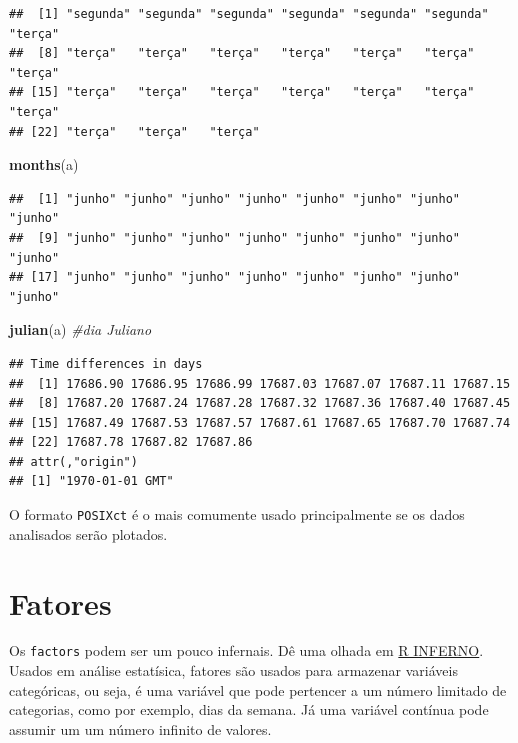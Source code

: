 \documentclass[]{book}
\newenvironment{Shaded}{\begin{snugshade}}{\end{snugshade}}
\newcommand{\KeywordTok}[1]{\textcolor[rgb]{0.13,0.29,0.53}{\textbf{#1}}}
\newcommand{\CommentTok}[1]{\textcolor[rgb]{0.56,0.35,0.01}{\textit{#1}}}
\newcommand{\NormalTok}[1]{#1}
\theoremstyle{definition}
\theoremstyle{definition}
\theoremstyle{definition}
\theoremstyle{remark}
\begin{document}
\begin{verbatim}
##  [1] "segunda" "segunda" "segunda" "segunda" "segunda" "segunda" "terça"  
##  [8] "terça"   "terça"   "terça"   "terça"   "terça"   "terça"   "terça"  
## [15] "terça"   "terça"   "terça"   "terça"   "terça"   "terça"   "terça"  
## [22] "terça"   "terça"   "terça"
\end{verbatim}

\begin{Shaded}
\begin{Highlighting}[]
\KeywordTok{months}\NormalTok{(a)}
\end{Highlighting}
\end{Shaded}

\begin{verbatim}
##  [1] "junho" "junho" "junho" "junho" "junho" "junho" "junho" "junho"
##  [9] "junho" "junho" "junho" "junho" "junho" "junho" "junho" "junho"
## [17] "junho" "junho" "junho" "junho" "junho" "junho" "junho" "junho"
\end{verbatim}

\begin{Shaded}
\begin{Highlighting}[]
\KeywordTok{julian}\NormalTok{(a) }\CommentTok{#dia Juliano}
\end{Highlighting}
\end{Shaded}

\begin{verbatim}
## Time differences in days
##  [1] 17686.90 17686.95 17686.99 17687.03 17687.07 17687.11 17687.15
##  [8] 17687.20 17687.24 17687.28 17687.32 17687.36 17687.40 17687.45
## [15] 17687.49 17687.53 17687.57 17687.61 17687.65 17687.70 17687.74
## [22] 17687.78 17687.82 17687.86
## attr(,"origin")
## [1] "1970-01-01 GMT"
\end{verbatim}

O formato \texttt{POSIXct} é o mais comumente usado principalmente se os
dados analisados serão plotados.

\section{Fatores}\label{fatores}

Os \texttt{factors} podem ser um pouco infernais. Dê uma olhada em
\href{http://www.burns-stat.com/documents/books/the-r-inferno/}{R
INFERNO}.\\
Usados em análise estatísica, fatores são usados para armazenar
variáveis categóricas, ou seja, é uma variável que pode pertencer a um
número limitado de categorias, como por exemplo, dias da semana. Já uma
variável contínua pode assumir um um número infinito de valores.
\end{document}
